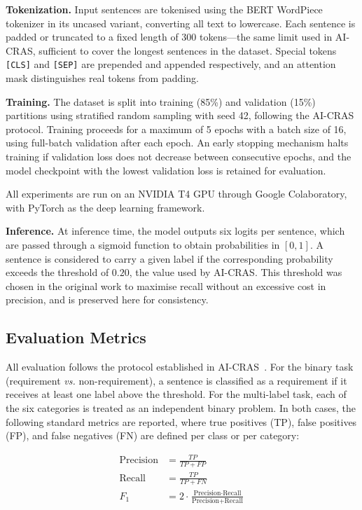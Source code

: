 \textbf{Tokenization.} Input sentences are tokenised using the BERT WordPiece tokenizer in its uncased variant, converting all text to lowercase. Each sentence is padded or truncated to a fixed length of 300 tokens—the same limit used in AI-CRAS, sufficient to cover the longest sentences in the dataset. Special tokens \texttt{[CLS]} and \texttt{[SEP]} are prepended and appended respectively, and an attention mask distinguishes real tokens from padding.

\textbf{Training.} The dataset is split into training (85\%) and validation (15\%) partitions using stratified random sampling with seed 42, following the AI-CRAS protocol. Training proceeds for a maximum of 5 epochs with a batch size of 16, using full-batch validation after each epoch. An early stopping mechanism halts training if validation loss does not decrease between consecutive epochs, and the model checkpoint with the lowest validation loss is retained for evaluation.

All experiments are run on an NVIDIA T4 GPU through Google Colaboratory, with PyTorch as the deep learning framework.

\textbf{Inference.} At inference time, the model outputs six logits per sentence, which are passed through a sigmoid function to obtain probabilities in $[0, 1]$. A sentence is considered to carry a given label if the corresponding probability exceeds the threshold of $0.20$, the value used by AI-CRAS. This threshold was chosen in the original work to maximise recall without an excessive cost in precision, and is preserved here for consistency.

\subsection{Evaluation Metrics}

All evaluation follows the protocol established in AI-CRAS~\cite{casalicchio2024aicras}. For the binary task (requirement \textit{vs.} non-requirement), a sentence is classified as a requirement if it receives at least one label above the threshold. For the multi-label task, each of the six categories is treated as an independent binary problem. In both cases, the following standard metrics are reported, where true positives (TP), false positives (FP), and false negatives (FN) are defined per class or per category:

\begin{align}
    \text{Precision} &= \frac{TP}{TP + FP} \label{eq:precision} \\
    \text{Recall}    &= \frac{TP}{TP + FN} \label{eq:recall} \\
    F_1              &= 2 \cdot \frac{\text{Precision} \cdot \text{Recall}}{\text{Precision} + \text{Recall}} \label{eq:f1}
\end{align}

